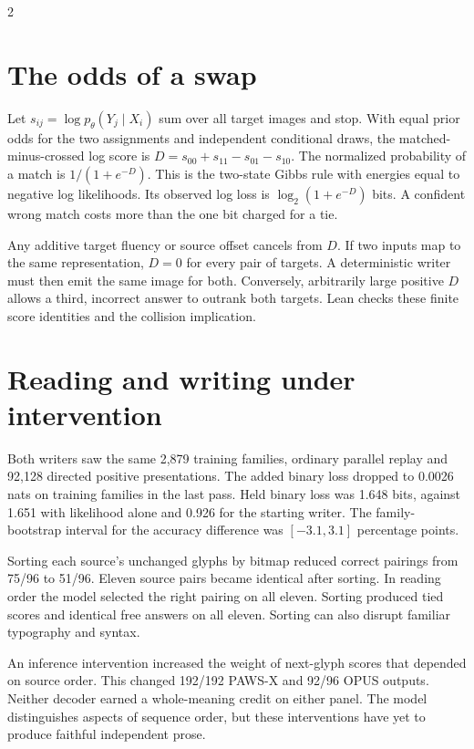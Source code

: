 \begin{multicols}{2}
\section*{The odds of a swap}
Let $s_{ij}=\log p_\theta(Y_j\mid X_i)$ sum over all target images and stop. With equal prior odds for the two assignments and independent conditional draws, the matched-minus-crossed log score is $D=s_{00}+s_{11}-s_{01}-s_{10}$. The normalized probability of a match is $1/(1+e^{-D})$. This is the two-state Gibbs rule with energies equal to negative log likelihoods. Its observed log loss is $\log_2(1+e^{-D})$ bits. A confident wrong match costs more than the one bit charged for a tie.
\par Any additive target fluency or source offset cancels from $D$. If two inputs map to the same representation, $D=0$ for every pair of targets. A deterministic writer must then emit the same image for both. Conversely, arbitrarily large positive $D$ allows a third, incorrect answer to outrank both targets. Lean checks these finite score identities and the collision implication.
\columnbreak
\section*{Reading and writing under intervention}
Both writers saw the same 2,879 training families, ordinary parallel replay and 92,128 directed positive presentations. The added binary loss dropped to 0.0026 nats on training families in the last pass. Held binary loss was 1.648 bits, against 1.651 with likelihood alone and 0.926 for the starting writer. The family-bootstrap interval for the accuracy difference was $[-3.1,3.1]$ percentage points.
\par Sorting each source's unchanged glyphs by bitmap reduced correct pairings from 75/96 to 51/96. Eleven source pairs became identical after sorting. In reading order the model selected the right pairing on all eleven. Sorting produced tied scores and identical free answers on all eleven. Sorting can also disrupt familiar typography and syntax.
\par An inference intervention increased the weight of next-glyph scores that depended on source order. This changed 192/192 PAWS-X and 92/96 OPUS outputs. Neither decoder earned a whole-meaning credit on either panel. The model distinguishes aspects of sequence order, but these interventions have yet to produce faithful independent prose.
\end{multicols}
